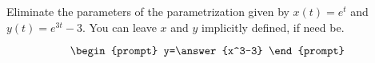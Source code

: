 \documentclass{ximera}
\author{Gregory Hartman \and Matthew Carr}
\begin{document}
\begin{exercise}




Eliminate the parameters of the parametrization given by $x(t)=e^t$ and $y(t)=e^{3t}-3$. You can leave $x$ and $y$ implicitly defined, if need be.

\[
\begin{prompt}
y=\answer{x^3-3}
\end{prompt}
\]

\end{exercise}
\end{document}
